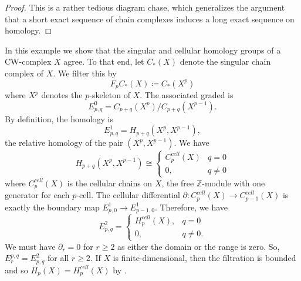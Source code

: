\documentclass[ma3408.tex]{subfiles}
\begin{document}
\begin{proof}
This is a rather tedious diagram chase, which generalizes the argument that a short exact sequence of chain complexes induces a long exact sequence on homology. 
\end{proof}
\begin{Exa}
	In this example we show that the singular and cellular homology groups of a CW-complex $X$ agree. To that end, let $C_*(X)$ denote the singular chain complex of $X$. We filter this by
	\[
F_pC_*(X) \coloneqq C_*(X^p)
	\]
	where $X^p$ denotes the $p$-skeleton of $X$. The associated graded is 
	\[
E^0_{p,q} = C_{p+q}(X^p)/C_{p+q}(X^{p-1}).
	\]
	By definition, the homology is
	\[
E^1_{p,q} = H_{p+q}(X^p,X^{p-1}),
	\]
	the relative homology of the pair $(X^p,X^{p-1})$. 	We have
	\[
H_{p+q}(X^p,X^{p-1})  \cong \begin{cases}
C_p^{cell}(X) & q = 0 \\
0, & q \ne 0
\end{cases}
	\]
	where $C_p^{cell}(X)$ is the cellular chains on $X$, the free $\mathbb{Z}$-module with one generator for each $p$-cell. The cellular differential $\partial \colon C_p^{cell}(X) \to C_{p-1}^{cell}(X)$ is exactly the boundary map $E^1_{p,0} \to E^1_{p-1,0}$. Therefore, we have
	\[
E^2_{p,q} = \begin{cases}
	H_p^{cell}(X), & q = 0 \\
	0, &q \ne 0. 
\end{cases}
	\]
	We must have $\partial_r = 0$ for $r \ge 2$ as either the domain or the range is zero. So, $E_r^{p,q} = E^2_{p,q}$ for all $r \ge 2$. If $X$ is finite-dimensional, then the filtration is bounded and so $H_p(X) = H_p^{cell}(X)$ by .
\end{Exa}
\end{document}
